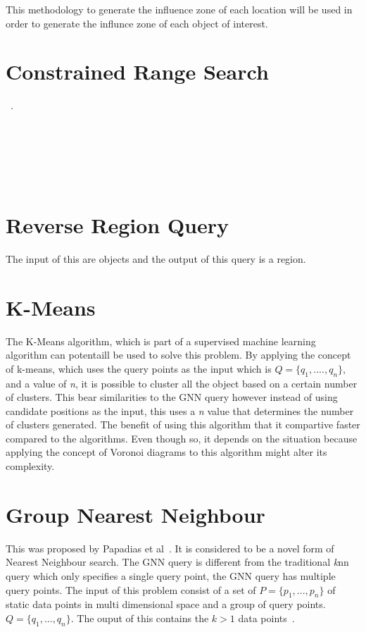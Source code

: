 \documentclass[a4paper,11pt]{article}
\begin{document}
This methodology to generate the influence zone of each location will be used in order to generate the influnce zone of each object of interest. 


\section{Constrained Range Search}

~\cite{xuan2011constrained}.

~\cite{kolahdouzan2004voronoi}

~\cite{zhao2008incremental}

~\cite{hu2006fast}

\section{Reverse Region Query}

The input of this are objects and the output of this query is a region. 

\section{K-Means}

The K-Means algorithm, which is part of a supervised machine learning algorithm can potentaill be used to solve this problem. By applying the concept of k-means, which uses the query points as the input which is $Q=\{q_1,....,q_n\}$, and a value of \textit{n}, it is possible to cluster all the object based on a certain number of clusters. This bear similarities to the GNN query however instead of using candidate positions as the input, this uses a \textit{n} value that determines the number of clusters generated. The benefit of using this algorithm that it compartive faster compared to the algorithms. Even though so, it depends on the situation because applying the concept of Voronoi diagrams to this algorithm might alter its complexity. 

\section{Group Nearest Neighbour} 

This was proposed by Papadias et al~\cite{papadias2004group}. It is considered to be a novel form of Nearest Neighbour search. The GNN query is different from the traditional \textit{k}nn query which only specifies a single query point, the GNN query has multiple query points. The input of this problem consist of  a set of $P=\{p_1,...,p_n\}$ of static data points in multi dimensional space and a group of query points. $Q=\{q_1,...,q_n\}$. The ouput of this contains the $k>1$ data points~\cite{papadias2004group}. 
\end{document}
